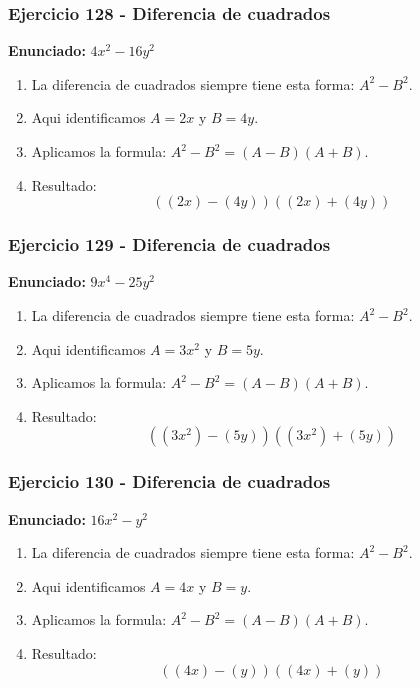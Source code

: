 \documentclass[11pt,a4paper]{article}
\begin{document}
\vspace{0.2cm}
\subsubsection*{Ejercicio 128 - Diferencia de cuadrados}
\textbf{Enunciado:} $ 4 x^{2} - 16 y^{2} $\par
\begin{enumerate}[leftmargin=2em]
\item La diferencia de cuadrados siempre tiene esta forma: \(A^2-B^2\).
\item Aqui identificamos \(A=2 x\) y \(B=4 y\).
\item Aplicamos la formula: \(A^2-B^2=(A-B)(A+B)\).
\item Resultado: \[\boxed{\left(\left(2 x\right)-\left(4 y\right)\right)\left(\left(2 x\right)+\left(4 y\right)\right)}\]
\end{enumerate}

\vspace{0.2cm}
\subsubsection*{Ejercicio 129 - Diferencia de cuadrados}
\textbf{Enunciado:} $ 9 x^{4} - 25 y^{2} $\par
\begin{enumerate}[leftmargin=2em]
\item La diferencia de cuadrados siempre tiene esta forma: \(A^2-B^2\).
\item Aqui identificamos \(A=3 x^{2}\) y \(B=5 y\).
\item Aplicamos la formula: \(A^2-B^2=(A-B)(A+B)\).
\item Resultado: \[\boxed{\left(\left(3 x^{2}\right)-\left(5 y\right)\right)\left(\left(3 x^{2}\right)+\left(5 y\right)\right)}\]
\end{enumerate}

\vspace{0.2cm}
\subsubsection*{Ejercicio 130 - Diferencia de cuadrados}
\textbf{Enunciado:} $ 16 x^{2} - y^{2} $\par
\begin{enumerate}[leftmargin=2em]
\item La diferencia de cuadrados siempre tiene esta forma: \(A^2-B^2\).
\item Aqui identificamos \(A=4 x\) y \(B=y\).
\item Aplicamos la formula: \(A^2-B^2=(A-B)(A+B)\).
\item Resultado: \[\boxed{\left(\left(4 x\right)-\left(y\right)\right)\left(\left(4 x\right)+\left(y\right)\right)}\]
\end{enumerate}
\end{document}
